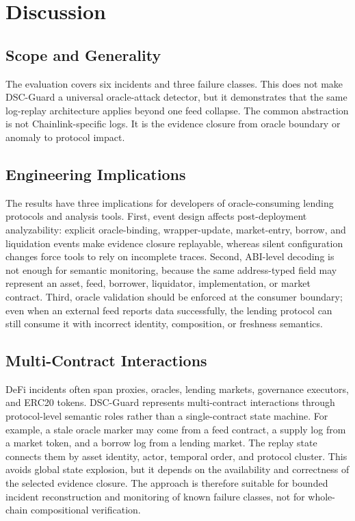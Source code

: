 \documentclass[final,5p]{elsarticle}
\newcommand{\tool}{DSC-Guard\xspace}
\begin{document}
\section{Discussion}
\label{sec:discussion}

\subsection{Scope and Generality}

The evaluation covers six incidents and three failure classes.
This does not make \tool a universal oracle-attack detector, but it demonstrates that the same log-replay architecture applies beyond one feed collapse.
The common abstraction is not Chainlink-specific logs.
It is the evidence closure from oracle boundary or anomaly to protocol impact.

\subsection{Engineering Implications}

The results have three implications for developers of oracle-consuming lending protocols and analysis tools.
First, event design affects post-deployment analyzability: explicit oracle-binding, wrapper-update, market-entry, borrow, and liquidation events make evidence closure replayable, whereas silent configuration changes force tools to rely on incomplete traces.
Second, ABI-level decoding is not enough for semantic monitoring, because the same address-typed field may represent an asset, feed, borrower, liquidator, implementation, or market contract.
Third, oracle validation should be enforced at the consumer boundary; even when an external feed reports data successfully, the lending protocol can still consume it with incorrect identity, composition, or freshness semantics.

\subsection{Multi-Contract Interactions}

DeFi incidents often span proxies, oracles, lending markets, governance executors, and ERC20 tokens.
\tool represents multi-contract interactions through protocol-level semantic roles rather than a single-contract state machine.
For example, a stale oracle marker may come from a feed contract, a supply log from a market token, and a borrow log from a lending market.
The replay state connects them by asset identity, actor, temporal order, and protocol cluster.
This avoids global state explosion, but it depends on the availability and correctness of the selected evidence closure.
The approach is therefore suitable for bounded incident reconstruction and monitoring of known failure classes, not for whole-chain compositional verification.
\end{document}
